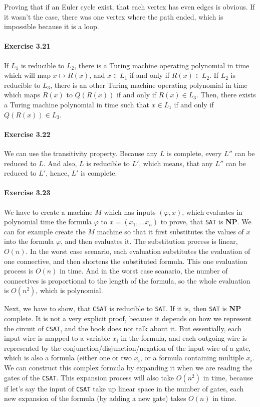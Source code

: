 \documentclass[a4paper,12pt]{article}
\newcommand{\exercise}[1]{\paragraph{Exercise #1}}
\begin{document}
    Proving that if an Euler cycle exist, that each vertex has even edges is obvious. If it wasn't the case, there was one vertex where the path ended, which is impossible because it is a loop.

    \exercise{3.21} If $L_1$ is reducible to $L_2$, there is a Turing machine operating polynomial in time which will map $x \mapsto R(x)$, and $x \in L_1$ if and only if $R(x) \in L_2$. If $L_2$ is reducible to $L_3$, there is an other Turing machine operating polynomial in time which maps $R(x)$ to $Q(R(x))$ if and only if $R(x) \in L_3$. Then, there exists a Turing machine polynomial in time such that $x \in L_1$ if and only if $Q(R(x)) \in L_3$.

    \exercise{3.22} We can use the transitivity property. Because any $L$ is complete, every $L''$ can be reduced to $L$. And also, $L$ is reducible to $L'$, which means, that any $L''$ can be reduced to $L'$, hence, $L'$ is complete.

    \exercise{3.23} We have to create a machine $M$ which has inputs $(\varphi, x)$, which evaluates in polynomial time the formula $\varphi$ to $x = (x_1, \ldots x_n)$ to prove, that \texttt{SAT} is \textbf{NP}. We can for example create the $M$ machine so that it first substitutes the values of $x$ into the formula $\varphi$, and then evaluates it. The substitution process is linear, $O(n)$. In the worst case scenario, each evaluation substitutes the evaluation of one connective, and then shortens the substituted formula. This one evaluation process is $O(n)$ in time. And in the worst case scanario, the number of connectives is proportional to the length of the formula, so the whole evaluation is $O(n^2)$, which is polynomial.

    Next, we have to show, that \texttt{CSAT} is reducible to \texttt{SAT}. If it is, then \texttt{SAT} is \textbf{NP} complete. It is not a very explicit proof, because it depends on how we represent the circuit of \texttt{CSAT}, and the book does not talk about it. But essentially, each input wire is mapped to a variable $x_i$ in the formula, and each outgoing wire is represented by the conjunction/disjunction/negation of the input wire of a gate, which is also a formula (either one or two $x_i$, or a formula containing multiple $x_i$. We can construct this complex formula by expanding it when we are reading the gates of the \texttt{CSAT}. This expansion process will also take $O(n^2)$ in time, because if let's say the input of \texttt{CSAT} take up linear space in the number of gates, each new expansion of the formula (by adding a new gate) takes $O(n)$ in time.
\end{document}
